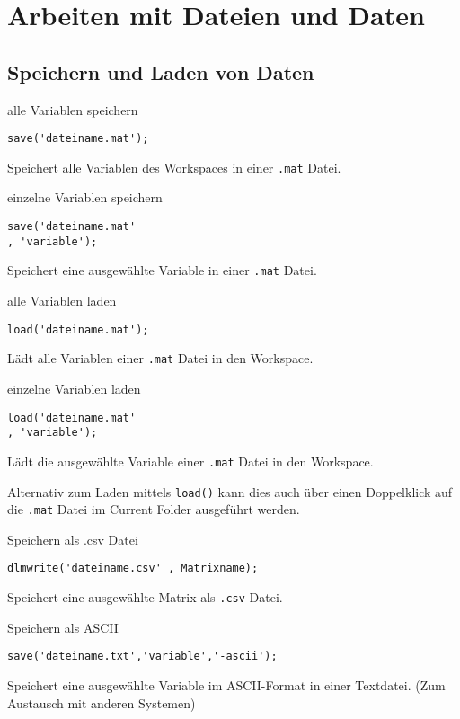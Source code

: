  \section{Arbeiten mit Dateien und Daten}
        \subsection{Speichern und Laden von Daten}
        \begin{CodeErklaerungBox}{alle Variablen speichern}
              \begin{lstlisting}
save('dateiname.mat');
              \end{lstlisting}
              \tcblower
              Speichert alle Variablen des Workspaces in einer \texttt{.mat} Datei.
        \end{CodeErklaerungBox}
        \begin{CodeErklaerungBox}{einzelne Variablen speichern}
              \begin{lstlisting}
save('dateiname.mat' 
, 'variable');
              \end{lstlisting}
              \tcblower
              Speichert eine ausgewählte Variable in einer \texttt{.mat} Datei.
        \end{CodeErklaerungBox}
                \begin{CodeErklaerungBox}{alle Variablen laden}
              \begin{lstlisting}
load('dateiname.mat');
              \end{lstlisting}
              \tcblower
              Lädt alle Variablen einer \texttt{.mat} Datei in den Workspace.
        \end{CodeErklaerungBox}
        \begin{CodeErklaerungBox}{einzelne Variablen laden}
              \begin{lstlisting}
load('dateiname.mat' 
, 'variable');
              \end{lstlisting}
              \tcblower
              Lädt die ausgewählte Variable einer \texttt{.mat} Datei in den Workspace.
        \end{CodeErklaerungBox}
       \noindent Alternativ zum Laden mittels \texttt{load()} kann dies auch über einen Doppelklick auf die \texttt{.mat} Datei im Current Folder ausgeführt werden.
       \begin{CodeErklaerungBox}{Speichern als .csv Datei}
              \begin{lstlisting}
dlmwrite('dateiname.csv' , Matrixname);
              \end{lstlisting}
              \tcblower
              Speichert eine ausgewählte Matrix als \texttt{.csv} Datei.
        \end{CodeErklaerungBox}
        \begin{CodeErklaerungBox}{Speichern als ASCII}
              \begin{lstlisting}
save('dateiname.txt','variable','-ascii');
              \end{lstlisting}
              \tcblower
              Speichert eine ausgewählte Variable im ASCII-Format in einer Textdatei. (Zum Austausch mit anderen Systemen)
        \end{CodeErklaerungBox}
